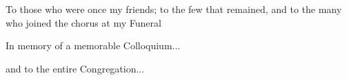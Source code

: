 \begin{comment}
\documentclass{book}
\usepackage{master}
\usepackage{changepage}
\newcommand{\rec}{$\text{R\'ecoltes et Semailles}$}
\newcommand{\no}{n$^\circ$}
\hfuzz = 100pt

\usepackage{titlesec}
\usepackage[dotinlabels]{titletoc}

\titleclass{\nnote}{straight}[\section]
\newcounter{nnote}
\renewcommand{\thennote}{\thesection.\arabic{nnote}}
\titlespacing*{\nnote}{0pt}{3.5ex plus 1ex minus .2ex}{1ex plus .2ex}
\titleformat{\nnote}[runin]{\bfseries }{\bfseries Note }{0pt}{}[]

\titleclass{\subnote}{straight}[\section]
\newcounter{subnote}
\renewcommand{\thesubnote}{\thesection.\arabic{subnote}}
\titlespacing*{\subnote}{0pt}{3.5ex plus 1ex minus .2ex}{1ex plus .2ex}
\titleformat{\subnote}[runin]{\bfseries }{\bfseries Note }{0pt}{}[]

\titlecontents{nnote}[9em]
{}{Note }{}{\titlerule*[1pc]{.}\contentspage}

\titlecontents{subnote}[11em]
{}{Note }{}{\titlerule*[1pc]{.}\contentspage}


\setcounter{tocdepth}{5}
\setcounter{secnumdepth}{5}
\startcontents[chapters]

\end{comment}

\newpage

\vspace*{\fill}

\begin{center} 
To those who were once my friends; \newline
to the few that remained, \newline
and to the many who joined the chorus at my \newline
Funeral \newline \newline

In memory of a memorable Colloquium... \newline \newline

and to the entire Congregation...

\end{center}

